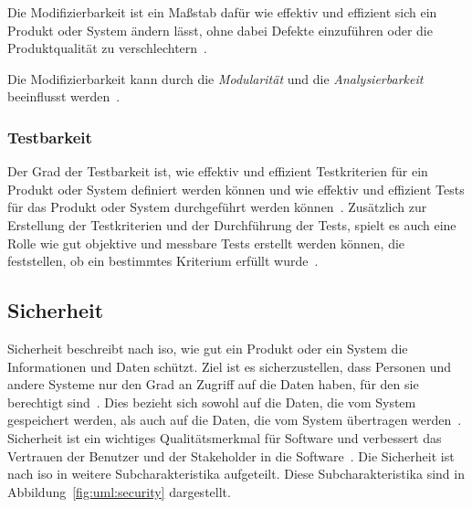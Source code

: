 \documentclass[12pt, a4paper, ngerman]{article}
\begin{document}
Die Modifizierbarkeit ist ein Maßstab dafür wie effektiv und effizient sich ein Produkt oder System
ändern lässt, ohne dabei Defekte einzuführen oder die Produktqualität zu verschlechtern~\cite{ISO25010}.

Die Modifizierbarkeit kann durch die \emph{Modularität} und die \emph{Analysierbarkeit} beeinflusst werden~\cite{ISO25010}.

\subsubsection{Testbarkeit}

Der Grad der Testbarkeit ist,
wie effektiv und effizient Testkriterien für ein Produkt oder System definiert werden können
und wie effektiv und effizient Tests für das Produkt oder System durchgeführt werden können~\cite{ISO25010}.
Zusätzlich zur Erstellung der Testkriterien und der Durchführung der Tests,
spielt es auch eine Rolle wie gut objektive und messbare Tests erstellt werden können,
die feststellen, ob ein bestimmtes Kriterium erfüllt wurde~\cite{IEEE24765}.

\subsection{Sicherheit}

Sicherheit beschreibt nach \ac{iso}, wie gut ein Produkt oder ein System die Informationen und Daten schützt.
Ziel ist es sicherzustellen, dass Personen und andere Systeme nur den Grad an Zugriff auf die Daten haben, für den sie berechtigt sind~\cite{ISO25010}.
Dies bezieht sich sowohl auf die Daten, die vom System gespeichert werden, als auch auf die Daten, die vom System übertragen werden~\cite{ISO25010}.
Sicherheit ist ein wichtiges Qualitätsmerkmal für Software und verbessert das Vertrauen der Benutzer und der Stakeholder in die Software~\cite{ISO25010}.
Die Sicherheit ist nach \ac{iso} in weitere Subcharakteristika aufgeteilt.
Diese Subcharakteristika sind in Abbildung~\ref{fig:uml:security} dargestellt.
\end{document}
